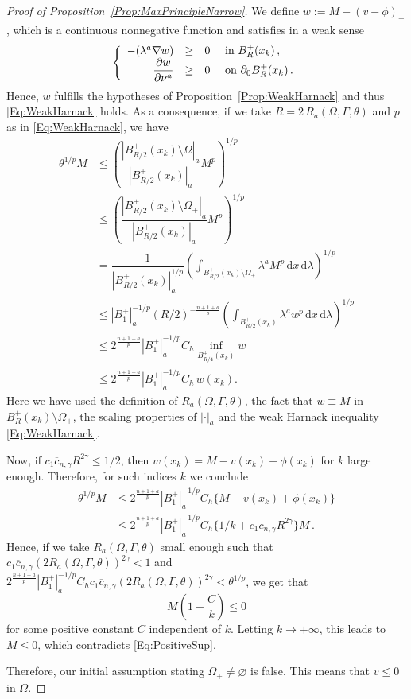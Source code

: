 \documentclass[12pt,reqno]{amsart}
\theoremstyle{definition}
\theoremstyle{remark}
\newcommand{\s}{\gamma}
\renewcommand{\d}{\,\mathrm{d}} %
\newcommand{\bpar}[1]{\left ( {#1}\right )}
\newcommand\beqc[1]{\left\{\begin{array}{#1}}
\newcommand\eeqc{\end{array} \right.}
\def\PDEsystem{rcll}
\let\div\relax
\DeclareMathOperator{\div}{div}
\numberwithin{equation}{section}
\begin{document}
\begin{proof}[Proof of Proposition~\ref{Prop:MaxPrincipleNarrow}]
	We define $w := M -(v-\phi)_+$, which is a continuous nonnegative function and satisfies in a weak sense
	$$
	\beqc{\PDEsystem}
	-\div(\lambda^a \nabla w) &\geq & 0 & \text{ in } B^+_R(x_k) \,, \\
	\dfrac{\partial w}{\partial \nu^a} & \geq & 0 & \text{ on } \partial_0 B^+_R(x_k)  \,.
	\eeqc
	$$
	Hence, $w$ fulfills the hypotheses of Proposition~\ref{Prop:WeakHarnack} and thus \eqref{Eq:WeakHarnack} holds. As a consequence, if we take $R = 2\,R_a( \Omega,\Gamma, \theta)$ and $p$ as in \eqref{Eq:WeakHarnack}, we have
	\begin{align*}
	\theta^{1/p} M & \leq \left (  \dfrac{|B^+_{R/2}(x_k)\setminus   \Omega|_a}{|B^+_{R/2}(x_k)|_a}  M^p \right)^{1/p} \\
	& \leq \left (  \dfrac{|B^+_{R/2}(x_k)\setminus  \Omega_+|_a}{|B^+_{R/2}(x_k)|_a}  M^p \right)^{1/p} \\
	&= \dfrac{1}{|B^+_{R/2}(x_k)|_a^{1/p}}  \left (  \int_{B^+_{R/2}(x_k)\setminus  \Omega_+} \lambda ^a M^p \d x \d \lambda  \right)^{1/p} \\
	&\leq |B_1^+|_a^{-1/p} (R/2)^{- \frac{n+1+a}{p}} \left (  \int_{B^+_{R/2}(x_k)} \lambda ^a w^p \d x \d \lambda  \right)^{1/p} \\
	&\leq 2^{\frac{n+1+a}{p}}|B_1^+|_a^{-1/p} C_h \inf_{B^+_{R/4}(x_k)} w \\
	& \leq 2^{\frac{n+1+a}{p}}|B_1^+|_a^{-1/p} C_h \,  w(x_k).
	\end{align*}
	Here we have used the definition of $R_a( \Omega,\Gamma,\theta)$, the fact that $w \equiv M$ in $B^+_R(x_k)\setminus \Omega_+$, the scaling properties of $|\cdot |_a$ and the weak Harnack inequality \eqref{Eq:WeakHarnack}. 
	
	Now, if $c_1 \overline{c}_{n,\s} R^{2\s} \leq 1/2$, then $w(x_k) = M - v(x_k) + \phi(x_k)$ for $k$ large enough. Therefore, for such indices $k$ we conclude
	\begin{align*}
		\theta^{1/p} M &\leq  2^{\frac{n+1+a}{p}}|B_1^+|_a^{-1/p} C_h \{M - v(x_k) + \phi(x_k) \} \\
		& \leq 2^{\frac{n+1+a}{p}}|B_1^+|_a^{-1/p} C_h \{1/k + c_1  \overline{c}_{n,\s} R^{2\s} \}M\,.
	\end{align*}
	Hence, if we take $R_a( \Omega,\Gamma, \theta)$ small enough such that $c_1 \overline{c}_{n,\s} (2 R_a( \Omega,\Gamma, \theta))^{2\s} < 1$ and $ 2^{\frac{n+1+a}{p}} |B_1^+|_a^{-1/p} C_h c_1 \overline{c}_{n,\s} (2 R_a( \Omega,\Gamma, \theta))^{2\s} < \theta^{1/p}$, we get that
	$$
	M \bpar{1- \dfrac{C}{k}}\leq 0
	$$
	for some positive constant $C$ independent of $k$. Letting $k\to +\infty$, this leads to $M \leq 0$, which contradicts \eqref{Eq:PositiveSup}. 
	
	Therefore, our initial assumption stating $ \Omega_+ \neq \varnothing$ is false. This means that $v\leq 0$ in $\Omega$.
\end{proof}
\end{document}
